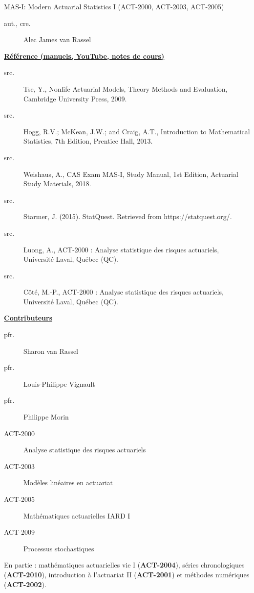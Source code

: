 \begin{contrib}{MAS-I: Modern Actuarial Statistics I (ACT-2000, ACT-2003, ACT-2005)}
\begin{description}
	\item[aut., cre.] Alec James van Rassel
\end{description}

\textbf{\underline{Référence (manuels, YouTube, notes de cours)}}
\begin{description}
	\item[src.]	Tse, Y., Nonlife Actuarial Models, Theory Methods and Evaluation, Cambridge University Press, 2009.
	\item[src.]	Hogg, R.V.; McKean, J.W.; and Craig, A.T., Introduction to Mathematical Statistics, 7th Edition, Prentice Hall, 2013.
	\item[src.]	Weishaus, A., CAS Exam MAS-I, Study Manual, 1st Edition, Actuarial Study Materials, 2018.
	\item[src.]	Starmer, J. (2015). StatQuest. Retrieved from https://statquest.org/.
	\item[src.]	Luong, A., ACT-2000 : Analyse statistique des risques actuariels, Université Laval, Québec (QC).
	\item[src.]	Côté, M.-P., ACT-2000 : Analyse statistique des risques actuariels, Université Laval, Québec (QC).
\end{description}

\textbf{\underline{Contributeurs}}
\begin{description}
	\item[pfr.]	Sharon van Rassel
	\item[pfr.]	Louis-Philippe Vignault
	\item[pfr.]	Philippe Morin
\end{description}
\end{contrib}

\begin{distributions}
\begin{description}
	\item[ACT-2000]	Analyse statistique des risques actuariels
	\item[ACT-2003]	Modèles linéaires en actuariat
	\item[ACT-2005]	Mathématiques actuarielles IARD I
	\item[ACT-2009]	Processus stochastiques
\end{description}

En partie : mathématiques actuarielles vie I (\textbf{ACT-2004}), séries chronologiques (\textbf{ACT-2010}), introduction à l'actuariat II (\textbf{ACT-2001}) et méthodes numériques (\textbf{ACT-2002}).
\end{distributions}
